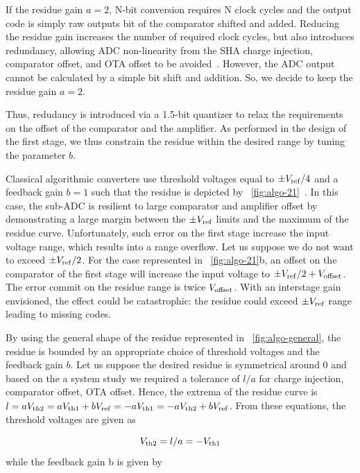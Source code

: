 If the residue gain \(a = 2\), N-bit conversion requires N clock cycles and the output code is simply raw outputs bit of the comparator shifted and added. Reducing the residue gain increases the number of required clock cycles, but also introduces redundancy, allowing ADC non-linearity from the SHA charge injection, comparator offset, and OTA offset to be avoided~\cite{Lewis1987}. However, the ADC output cannot be calculated by a simple bit shift and addition. So, we decide to keep the residue gain \(a = 2\).

Thus, redudancy is introduced via a 1.5-bit quantizer to relax the requirements on the offset of the comparator and the amplifier. As performed in the design of the first stage, we thus constrain the residue within the desired range by tuning the parameter $b$.

Classical algorithmic converters use threshold voltages equal to \(\pm V_{\rm ref}/4\) and a feedback gain \(b = 1\) such that the residue is depicted by \figurename~\ref{fig:algo-21}~\cite{Brooks2009,Naderi2017}. In this case, the sub-ADC is resilient to large comparator and amplifier offset by demonstrating a large margin between the \(\pm V_{\rm ref}\) limits and the maximum of the residue curve. Unfortunately, such error on the first stage increase the input voltage range, which results into a range overflow. Let us suppose we do not want to exceed $\pm V_{\rm ref}/2$. For the case represented in \figurename~\ref{fig:algo-21}b, an offset on the comparator of the first stage will increase the input voltage to $\pm V_{\rm ref}/2+V_{\rm offset}$. The error commit on the residue range is twice $V_{\rm offset}$. With an interstage gain envisioned, the effect could be catastrophic: the residue could exceed $\pm V_{\rm ref}$ range leading to missing codes.

By using the general shape of the residue represented in \figurename~\ref{fig:algo-general}, the residue is bounded by an appropriate choice of threshold voltages and the feedback gain \(b\). Let us suppose the desired residue is symmetrical around 0 and based on the a system study we required a tolerance of \(l/a\) for charge injection, comparator offset, OTA offset. Hence, the extrema of the residue curve is \(l = aV_{\rm th2} = aV_{\rm th1}+bV_{\rm ref} = -aV_{\rm th1} = -aV_{\rm th2}+bV_{\rm ref}\). From these equations, the threshold voltages are given as 

\begin{equation}
V_{\rm th2} = l/a = -V_{\rm th1}
\end{equation}
while the feedback gain b is given by 

